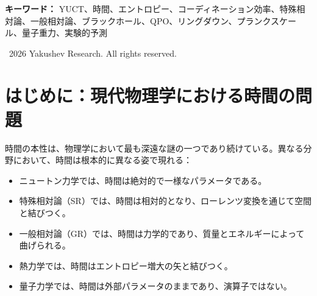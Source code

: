 \documentclass[12pt,a4paper]{article}
\begin{document}
\begin{titlepage}
\begin{center}
\begin{minipage}{0.9\textwidth}
\begin{abstract}
					さらに、この枠組みをブラックホールに拡張し、時間の揺らぎの質量に対するスケーリングが普遍指数 \(\beta = 0.67\) に従うことを示す。時間の進み方の相対的不確かさは \(\delta\tau/\tau \propto M^{-0.67}\) とスケールし、以下の具体的で検証可能な予測をもたらす：(i) ブラックホール降着円盤における準周期振動（QPO）の幅は、\(\Delta\nu/\nu \propto M^{-0.67}\) に従って質量とともに減少する；(ii) 合体するブラックホールのリングダウン周波数の分散は、同じ法則に従って質量とともに減少する。これらの予測は、既存のX線データ（RXTE、NuSTAR）および重力波観測（LIGO/Virgo、将来のEinstein Telescope）を用いて検証可能である。この枠組みは、時間の相対論的、重力的、熱力学的側面を統一し、普遍スケーリング則 \(\beta = 0.67\)（付録L）および複雑系の進化ダイナミクス（付録T）と整合する首尾一貫した描像を提供する。
				\end{abstract}
			\end{minipage}
			
			\vspace{1cm}
			
			\noindent
			\small\textbf{キーワード：} YUCT、時間、エントロピー、コーディネーション効率、特殊相対論、一般相対論、ブラックホール、QPO、リングダウン、プランクスケール、量子重力、実験的予測
			
			\vspace{0.5cm}
			
			\noindent
			\textcopyright\ 2026 Yakushev Research. All rights reserved.
		\end{center}
	\end{titlepage}
	
	\tableofcontents
	\newpage
	
	\section{はじめに：現代物理学における時間の問題}
	\label{sec:intro}
	
	時間の本性は、物理学において最も深遠な謎の一つであり続けている。異なる分野において、時間は根本的に異なる姿で現れる：
	\begin{itemize}
		\item ニュートン力学では、時間は絶対的で一様なパラメータである。
		\item 特殊相対論（SR）では、時間は相対的となり、ローレンツ変換を通じて空間と結びつく。
		\item 一般相対論（GR）では、時間は力学的であり、質量とエネルギーによって曲げられる。
		\item 熱力学では、時間はエントロピー増大の矢と結びつく。
		\item 量子力学では、時間は外部パラメータのままであり、演算子ではない。
	\end{itemize}
	
\end{document}
